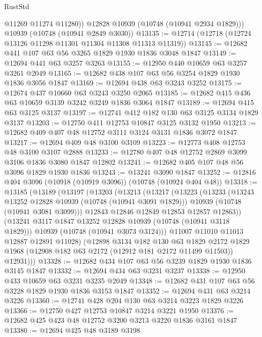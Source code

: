 \begin{lexlean}{RustStd}
\begin{coremodule}
          @11269
          @11274
          @11280))
      @12828
      @10939
      (@10748 (@10941 @2934 @1829)))
    @10939
    (@10748 (@10941 @2849 @3030))
@13135 := @12714 (@12718 (@12724 @13126 @11298 @11301 @11304 @11308 @11313 @11319))
@13145 := @12682 @441 @107 @63 @56 @3265 @1829 @1930 @1836 @3048 @1847
@13149 := @12694 @441 @63 @3257 @3263
@13155 := @12950 @440 @10659 @63 @3257 @3261 @2049
@13165 := @12682 @438 @107 @63 @56 @3254 @1829 @1930 @1836 @3056 @1847
@13169 := @12694 @438 @63 @3243 @3252
@13175 := @12674 @437 @10660 @63 @3243 @3250 @2065
@13185 := @12682 @415 @436 @63 @10659 @3139 @3242 @3249 @1836 @3064 @1847
@13189 := @12694 @415 @63 @3125 @3137
@13197 := @12741 @412 @182 @130 @63 @3125 @3134 @1829 @3137
@13203 := @12750 @411 @12753 @10847 @3125 @3132 @1950
@13213 := @12682 @409 @407 @48 @12752 @3111 @3124 @3131 @1836 @3072 @1847
@13217 := @12694 @409 @48 @3100 @3109
@13223 := @12773 @408 @12753 @48 @3100 @3107 @2888
@13233 := @12780 @407 @48 @12752 @2869 @3099 @3106 @1836 @3080 @1847 @12802
@13241 := @12682 @405 @107 @48 @56 @3096 @1829 @1930 @1836
@13243 := @13241 @3090 @1847
@13252 := @12816 @404 @3096 (@10918 (@10919 @3096)) (@10748 (@10924 @404 @48))
@13318 := @13185
    (@13189
      (@13197
        (@13203
          (@13213
            (@13217
              (@13223
                (@13233
                  (@13243 @13252 @12828 @10939 (@10748 (@10941 @3091 @1829)))
                  @10939
                  (@10748 (@10941 @3081 @3099)))
                @12843
                @12846
                @12849
                @12853
                @12857
                @12863))
            (@13241 @3117 @1847 @13252 @12828 @10939 (@10748 (@10941 @3118 @1829)))
            @10939
            (@10748 (@10941 @3073 @3124)))
          @11007
          @11010
          @11013
          @12887
          @12891
          @11028)
        (@12898
          @3134
          @182
          @130
          @63
          @1829
          @2172
          @1829
          @1968
          (@12908 @182 @63 @2172 (@12912 @181 @2172 @11499 @11503))
          @12931)))
@13328 := @12682 @434 @107 @63 @56 @3239 @1829 @1930 @1836 @3145 @1847
@13332 := @12694 @434 @63 @3231 @3237
@13338 := @12950 @433 @10659 @63 @3231 @3235 @2049
@13348 := @12682 @431 @107 @63 @56 @3228 @1829 @1930 @1836 @3153 @1847
@13352 := @12694 @431 @63 @3214 @3226
@13360 := @12741 @428 @204 @130 @63 @3214 @3223 @1829 @3226
@13366 := @12750 @427 @12753 @10847 @3214 @3221 @1950
@13376 := @12682 @425 @423 @48 @12752 @3200 @3213 @3220 @1836 @3161 @1847
@13380 := @12694 @425 @48 @3189 @3198

\end{coremodule}
\end{lexlean}
